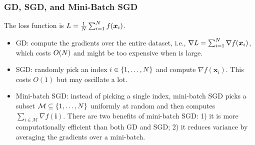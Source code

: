     
    
    \subsubsection{GD, SGD, and Mini-Batch SGD}
        The loss function is $L = \frac{1}{N}\sum_{i=1}^{N}{f(\bm{x}_i)}$.
        \begin{itemize}
            \item GD: compute the gradients over the entire dataset, i.e., $\nabla L = \sum_{i=1}^{N}{\nabla f(\bm{x}_i)}$, which costs $O(N)$ and might be too expensive when \ndata is large.
            \item SGD: randomly pick an index $i \in \{ 1, \ldots, N \}$ and compute $\nabla f(\bm{x}_i)$. This costs $O(1)$ but may oscillate a lot.
            \item Mini-batch SGD: instead of picking a single index, mini-batch SGD picks a subset $\mathcal{M} \subseteq \{ 1, \ldots, N \}$ uniformly at random and then computes $\sum_{i \in \mathcal{M}}^{}{\nabla f(\bm{i})}$.
            There are two benefits of mini-batch SGD: 1) it is more computationally efficient than both GD and SGD; 2) it reduces variance by averaging the gradients over a mini-batch.
        \end{itemize}
        
